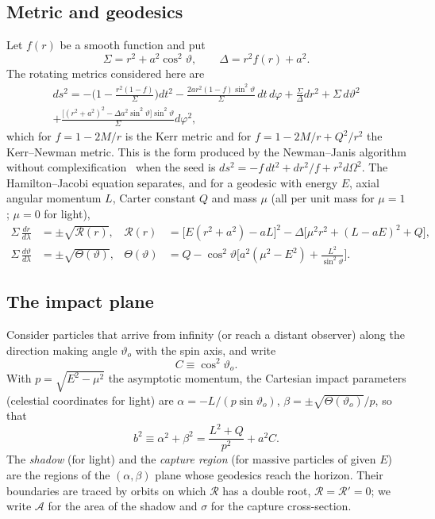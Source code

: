 \documentclass[11pt,a4paper]{article}
\theoremstyle{remark}
\numberwithin{equation}{section}
\begin{document}
\subsection{Metric and geodesics}
Let $f(r)$ be a smooth function and put
\begin{equation}
\Sigma=r^2+a^2\cos^2\vartheta,\qquad \Delta=r^2f(r)+a^2 .
\end{equation}
The rotating metrics considered here are
\begin{multline}
ds^2=-\Big(1-\frac{r^2(1-f)}{\Sigma}\Big)dt^2-\frac{2a r^2(1-f)\sin^2\vartheta}{\Sigma}\,dt\,d\varphi
+\frac{\Sigma}{\Delta}dr^2+\Sigma\, d\vartheta^2\\
+\frac{\big[(r^2+a^2)^2-\Delta a^2\sin^2\vartheta\big]\sin^2\vartheta}{\Sigma}d\varphi^2 ,
\label{eq:metric}
\end{multline}
which for $f=1-2M/r$ is the Kerr metric and for $f=1-2M/r+Q^2/r^2$ the Kerr--Newman metric. This is
the form produced by the Newman--Janis algorithm without complexification~\cite{AzregAinou2014}
when the seed is $ds^2=-f\,dt^2+dr^2/f+r^2d\Omega^2$. The Hamilton--Jacobi equation separates, and for
a geodesic with energy $E$, axial angular momentum $L$, Carter constant $Q$ and mass $\mu$
(all per unit mass for $\mu=1$; $\mu=0$ for light),
\begin{align}
\Sigma\,\frac{dr}{d\lambda}&=\pm\sqrt{\mathcal R(r)},&
\mathcal R(r)&=\big[E(r^2+a^2)-aL\big]^2-\Delta\big[\mu^2r^2+(L-aE)^2+Q\big],\label{eq:R}\\
\Sigma\,\frac{d\vartheta}{d\lambda}&=\pm\sqrt{\Theta(\vartheta)},&
\Theta(\vartheta)&=Q-\cos^2\vartheta\Big[a^2(\mu^2-E^2)+\frac{L^2}{\sin^2\vartheta}\Big].
\end{align}

\subsection{The impact plane}
Consider particles that arrive from infinity (or reach a distant observer) along the direction
making angle $\vartheta_o$ with the spin axis, and write
\begin{equation}
C\equiv\cos^2\vartheta_o .
\end{equation}
With $p=\sqrt{E^2-\mu^2}$ the asymptotic momentum, the Cartesian impact parameters (celestial
coordinates for light) are $\alpha=-L/(p\sin\vartheta_o)$, $\beta=\pm\sqrt{\Theta(\vartheta_o)}/p$, so that
\begin{equation}
b^2\equiv\alpha^2+\beta^2=\frac{L^2+Q}{p^2}+a^2C .
\label{eq:b2}
\end{equation}
The \emph{shadow} (for light) and the \emph{capture region} (for massive particles of given $E$)
are the regions of the $(\alpha,\beta)$ plane whose geodesics reach the horizon. Their boundaries
are traced by orbits on which $\mathcal R$ has a double root, $\mathcal R=\mathcal R'=0$; we write
$\mathcal A$ for the area of the shadow and $\sigma$ for the capture cross-section.
\end{document}
